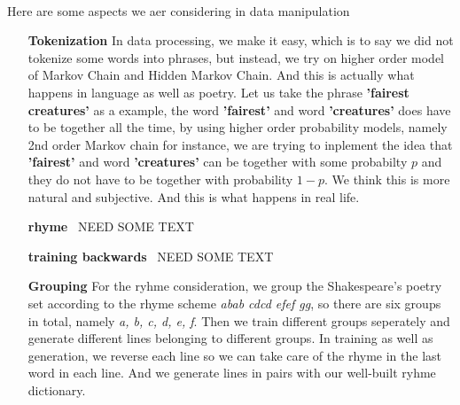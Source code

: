 %
\paragraph{}
Here are some aspects we aer considering in data manipulation
\begin{enumerate}
	\item [\color{blue}\textbf{Tokenization}] In data processing, we make it easy, which is to say we did not tokenize some words into phrases, but instead, we try on higher order model of Markov Chain and Hidden Markov Chain. And this is actually what happens in language as well as poetry. Let us take the phrase \textbf{'fairest creatures'} as a example, the word \textbf{'fairest'} and word \textbf{'creatures'} does have to be together all the time, by using higher order probability models, namely 2nd order Markov chain for instance, we are trying to inplement the idea that \textbf{'fairest'} and word \textbf{'creatures'} can be together with some probabilty $p$ and they do not have to be together with probability $1-p$. We think this is more natural and subjective. And this is what happens in real life.
	\item [\color{blue}\textbf{rhyme}]{\color{blue}\ NEED SOME TEXT}
	\item [\color{blue}\textbf{training backwards}]{\color{blue}\ NEED SOME TEXT}
	\item [\color{blue}\textbf{Grouping}] For the ryhme consideration, we group the Shakespeare's poetry set according to the rhyme scheme \textit{abab cdcd efef gg}, so there are six groups in total, namely \textit{a, b, c, d, e, f}. Then we train different groups seperately and generate different lines belonging to different groups. In training as well as generation, we reverse each line so we can take care of the rhyme in the last word in each line. And we generate lines in pairs with our well-built ryhme dictionary.  
\end{enumerate}